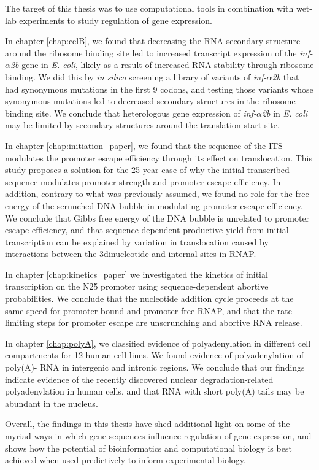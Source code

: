 %
The target of this thesis was to use computational tools in combination with
wet-lab experiments to study regulation of gene expression.

In chapter \ref{chap:celB}, we found that decreasing the RNA secondary
structure around the ribosome binding site led to increased transcript
expression of the \textit{inf-$\alpha$2b} gene in \textit{E. coli}, likely as a
result of increased RNA stability through ribosome binding. We did this by
\textit{in silico} screening a library of variants of \textit{inf-$\alpha$2b}
that had synonymous mutations in the first 9 codons, and testing those variants
whose synonymous mutations led to decreased secondary structures in the
ribosome binding site. We conclude that heterologous gene expression of
\textit{inf-$\alpha$2b} in \textit{E. coli} may be limited by secondary
structures around the translation start site.

In chapter \ref{chap:initiation_paper}, we found that the sequence of the ITS
modulates the promoter escape efficiency through its effect on translocation.
This study proposes a solution for the 25-year case of why the initial
transcribed sequence modulates promoter strength and promoter escape
efficiency. In addition, contrary to what was previously assumed, we found no
role for the free energy of the scrunched DNA bubble in modulating promoter
escape efficiency. We conclude that Gibbs free energy of the DNA bubble is
unrelated to promoter escape efficiency, and that sequence dependent
productive yield from initial transcription can be explained by variation in
translocation caused by interactions between the 3\ppp dinucleotide and
internal sites in RNAP.

In chapter \ref{chap:kinetics_paper} we investigated the kinetics of initial
transcription on the N25 promoter using sequence-dependent abortive
probabilities. We conclude that the nucleotide addition cycle proceeds at the
same speed for promoter-bound and promoter-free RNAP, and that the rate
limiting steps for promoter escape are unscrunching and abortive RNA release.

In chapter \ref{chap:polyA}, we classified evidence of polyadenylation in
different cell compartments for 12 human cell lines. We found evidence of
polyadenylation of poly(A)- RNA in intergenic and intronic regions. We
conclude that our findings indicate evidence of the recently discovered
nuclear degradation-related polyadenylation in human cells, and that RNA with
short poly(A) tails may be abundant in the nucleus.

Overall, the findings in this thesis have shed additional light on some of the
myriad ways in which gene sequences influence regulation of gene expression,
and shows how the potential of bioinformatics and computational biology is
best achieved when used predictively to inform experimental biology.
